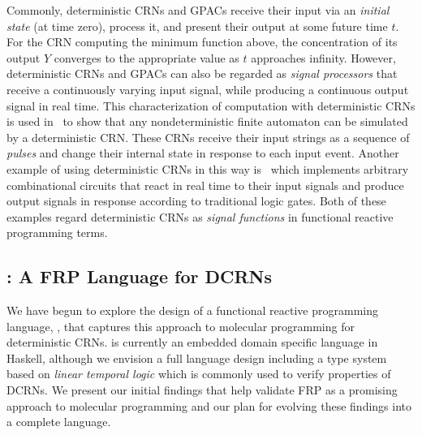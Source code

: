 Commonly, deterministic CRNs and GPACs receive their input via an \emph{initial state} (at time zero), process it, and present their output at some future time \( t \).
For the CRN computing the minimum function above, the concentration of its output \( Y \) converges to the appropriate value as \( t \) approaches infinity.
However, deterministic CRNs and GPACs can also be regarded as \emph{signal processors} that receive a continuously varying input signal, while producing a continuous output signal in real time.
This characterization of computation with deterministic CRNs is used in~\cite{jKlLaLu20} to show that any nondeterministic finite automaton can be simulated by a deterministic CRN.
These CRNs receive their input strings as a sequence of \emph{pulses} and change their internal state in response to each input event.
Another example of using deterministic CRNs in this way is~\cite{rdc} which implements arbitrary combinational circuits that react in real time to their input signals and produce output signals in response according to traditional logic gates.
Both of these examples regard deterministic CRNs as \emph{signal functions} in functional reactive programming terms.

\subsection{\reactamole{}: A FRP Language for DCRNs}
\label{sub:dcrn_haskell_language}
We have begun to explore the design of a functional reactive programming language, \reactamole{}, that captures this approach to molecular programming for deterministic CRNs.
\reactamole{} is currently an embedded domain specific language in Haskell, although we envision a full language design including a type system based on \emph{linear temporal logic} which is commonly used to verify properties of DCRNs.
We present our initial findings that help validate FRP as a promising approach to molecular programming and our plan for evolving these findings into a complete language.

